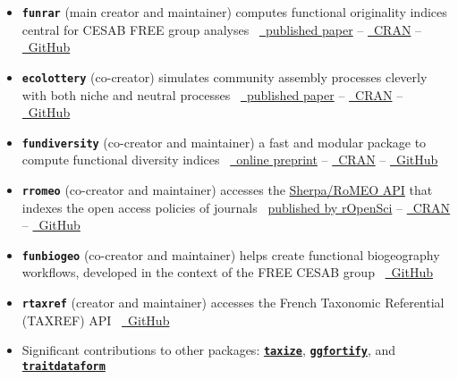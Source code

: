 \documentclass[10pt,a4paper,]{article}
\begin{document}
\begin{itemize}
\item
  \textbf{\texttt{funrar}} (main creator and maintainer)
  \hfill\break computes functional originality indices central for CESAB
  FREE group analyses
  \hfill\break ~\href{https://doi.org/10.1111/ddi.12629}{\faFile*~published
  paper} --
  \href{https://cran.r-project.org/package=funrar}{\faRProject~CRAN} --
  \href{https://github.com/Rekyt/funrar}{\faGithub~GitHub}
\item
  \textbf{\texttt{ecolottery}} (co-creator) \hfill\break simulates
  community assembly processes cleverly with both niche and neutral
  processes
  \hfill\break ~\href{https://doi.org/10.1111/2041-210X.12918}{\faFile*~published
  paper} --
  \href{https://cran.r-project.org/package=ecolottery}{\faRProject~CRAN}
  -- \href{https://github.com/frmunoz/ecolottery}{\faGithub~GitHub}
\item
  \textbf{\texttt{fundiversity}} (co-creator and maintainer)
  \hfill\break a fast and modular package to compute functional
  diversity indices
  \hfill\break ~\href{https:////doi.org/10.32942/osf.io/dg7hw}{\faFile*~online
  preprint} --
  \href{https://cran.r-project.org/package=fundiversity}{\faRProject~CRAN}
  -- \href{https://github.com/bisaloo/fundiversity}{\faGithub~GitHub}
\item
  \textbf{\texttt{rromeo}} (co-creator and maintainer)
  \hfill\break accesses the
  \href{https://v2.sherpa.ac.uk/romeo/}{Sherpa/RoMEO API} that indexes
  the open access policies of journals
  \hfill\break~\href{https://docs.ropensci.org/rromeo}{published by
  rOpenSci} --
  \href{https://cran.r-project.org/package=rromeo}{\faRProject~CRAN} --
  \href{https://github.com/ropensci/rromeo}{\faGithub~GitHub}
\item
  \textbf{\texttt{funbiogeo}} (co-creator and maintainer)
  \hfill\break helps create functional biogeography workflows, developed
  in the context of the FREE CESAB group
  \hfill\break ~\href{https://github.com/FRBCesab/funbiogeo}{\faGithub~GitHub}
\item
  \textbf{\texttt{rtaxref}} (creator and maintainer)
  \hfill\break accesses the French Taxonomic Referential (TAXREF) API
  \hfill\break ~\href{https://github.com/Rekyt/rtaxref}{\faGithub~GitHub}
\item
  Significant contributions to other packages:
  \href{https://cran.r-project.org/package=taxize}{\textbf{\texttt{taxize}}},
  \href{https://cran.r-project.org/package=ggfortify}{\textbf{\texttt{ggfortify}}},
  and
  \href{https://cran.r-project.org/package=traitdataform}{\textbf{\texttt{traitdataform}}}
\end{itemize}
\end{document}
